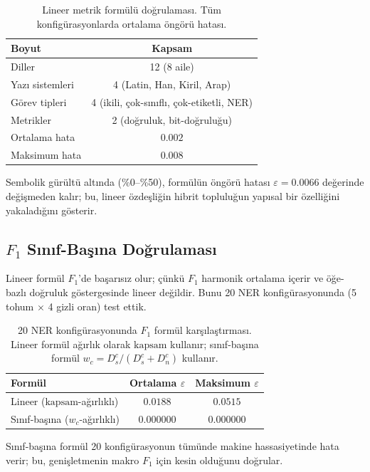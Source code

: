 \documentclass[11pt,a4paper]{article}
\begin{document}
\begin{table}[h]
\centering
\caption{Lineer metrik formülü doğrulaması. Tüm konfigürasyonlarda
ortalama öngörü hatası.}
\label{tab:linear}
\small
\begin{tabular}{lc}
\toprule
Boyut & Kapsam \\
\midrule
Diller           & 12 (8 aile) \\
Yazı sistemleri  & 4 (Latin, Han, Kiril, Arap) \\
Görev tipleri    & 4 (ikili, çok-sınıflı, çok-etiketli, NER) \\
Metrikler        & 2 (doğruluk, bit-doğruluğu) \\
\midrule
Ortalama hata    & $0.002$ \\
Maksimum hata    & $0.008$ \\
\bottomrule
\end{tabular}
\end{table}

Sembolik gürültü altında (\%0--\%50), formülün öngörü hatası
$\varepsilon = 0.0066$ değerinde değişmeden kalır; bu, lineer özdeşliğin
hibrit topluluğun yapısal bir özelliğini yakaladığını gösterir.

\subsection{$F_1$ Sınıf-Başına Doğrulaması}
\label{sec:exp-f1}

Lineer formül $F_1$'de başarısız olur; çünkü $F_1$ harmonik ortalama
içerir ve öğe-bazlı doğruluk göstergesinde lineer değildir. Bunu 20 NER
konfigürasyonunda (5 tohum $\times$ 4 gizli oran) test ettik.

\begin{table}[h]
\centering
\caption{20 NER konfigürasyonunda $F_1$ formül karşılaştırması.
Lineer formül ağırlık olarak $\text{kapsam}$ kullanır; sınıf-başına
formül $w_c = D_s^c / (D_s^c + D_n^c)$ kullanır.}
\label{tab:f1}
\small
\begin{tabular}{lcc}
\toprule
Formül & Ortalama $\varepsilon$ & Maksimum $\varepsilon$ \\
\midrule
Lineer ($\text{kapsam}$-ağırlıklı)     & $0.0188$ & $0.0515$ \\
Sınıf-başına ($w_c$-ağırlıklı) & $0.000000$ & $0.000000$ \\
\bottomrule
\end{tabular}
\end{table}

Sınıf-başına formül 20 konfigürasyonun tümünde makine hassasiyetinde
hata verir; bu, genişletmenin makro $F_1$ için kesin olduğunu doğrular.
\end{document}
